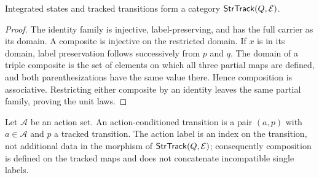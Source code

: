 \begin{proposition}
Integrated states and tracked transitions form a category
$\mathsf{StrTrack}(Q,\mathcal E)$.
\end{proposition}

\begin{proof}
The identity family is injective, label-preserving, and has the full carrier as
its domain. A composite is injective on the restricted domain. If $x$ is in
its domain, label preservation follows successively from $p$ and $q$. The
domain of a triple composite is the set of elements on which all three partial
maps are defined, and both parenthesizations have the same value there. Hence
composition is associative. Restricting either composite by an identity leaves
the same partial family, proving the unit laws.
\end{proof}

\begin{definition}
Let $\mathcal A$ be an action set. An action-conditioned transition is a pair
$(a,p)$ with $a\in\mathcal A$ and $p$ a tracked transition. The action label is
an index on the transition, not additional data in the morphism of
$\mathsf{StrTrack}(Q,\mathcal E)$; consequently composition is defined on the tracked
maps and does not concatenate incompatible single labels.
\end{definition}
